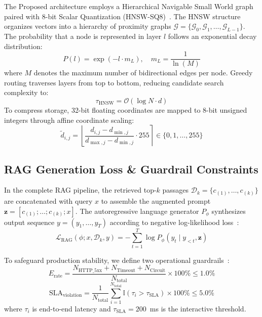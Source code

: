 \documentclass[conference]{IEEEtran}
\begin{document}
The Proposed architecture employs a Hierarchical Navigable Small World graph paired with 8-bit Scalar Quantization (HNSW-SQ8)~\cite{malkov2018hnsw}. The HNSW structure organizes vectors into a hierarchy of proximity graphs $\mathcal{G} = \{\mathcal{G}_0, \mathcal{G}_1, \dots, \mathcal{G}_{L-1}\}$. The probability that a node is represented in layer $l$ follows an exponential decay distribution:
\begin{equation}
P(l) = \exp(-l \cdot m_L), \quad m_L = \frac{1}{\ln(M)}
\label{eq:hnsw_decay}
\end{equation}
where $M$ denotes the maximum number of bidirectional edges per node. Greedy routing traverses layers from top to bottom, reducing candidate search complexity to:
\begin{equation}
\tau_{\text{HNSW}} = \mathcal{O}(\log N \cdot d)
\label{eq:hnsw_complexity}
\end{equation}
To compress storage, 32-bit floating coordinates are mapped to 8-bit unsigned integers through affine coordinate scaling:
\begin{equation}
\tilde{d}_{i,j} = \left\lfloor \frac{d_{i,j} - d_{\min, j}}{d_{\max, j} - d_{\min, j}} \cdot 255 \right\rceil \in \{0, 1, \dots, 255\}
\label{eq:sq8_quant}
\end{equation}

\subsection{RAG Generation Loss \& Guardrail Constraints}
In the complete RAG pipeline, the retrieved top-$k$ passages $\mathcal{D}_k = \{c_{(1)}, \dots, c_{(k)}\}$ are concatenated with query $x$ to assemble the augmented prompt $\mathbf{z} = [c_{(1)}; \dots; c_{(k)}; x]$. The autoregressive language generator $P_{\phi}$ synthesizes output sequence $y = (y_1, \dots, y_T)$ according to negative log-likelihood loss~\cite{lewis2020rag}:
\begin{equation}
\mathcal{L}_{\text{RAG}}(\phi; x, \mathcal{D}_k, y) = -\sum_{t=1}^T \log P_{\phi}\left(y_t \mid y_{<t}, \mathbf{z}\right)
\label{eq:rag_loss}
\end{equation}

To safeguard production stability, we define two operational guardrails~\cite{gray1993benchmark}:
\begin{equation}
E_{\text{rate}} = \frac{N_{\text{HTTP\_5xx}} + N_{\text{Timeout}} + N_{\text{Circuit}}}{N_{\text{total}}} \times 100\% \le 1.0\%
\label{eq:error_rate}
\end{equation}
\begin{equation}
\text{SLA}_{\text{violation}} = \frac{1}{N_{\text{total}}} \sum_{i=1}^{N_{\text{total}}} \mathbb{I}\left(\tau_i > \tau_{\text{SLA}}\right) \times 100\% \le 5.0\%
\label{eq:sla_violation}
\end{equation}
where $\tau_i$ is end-to-end latency and $\tau_{\text{SLA}} = 200$~ms is the interactive threshold.
\end{document}
